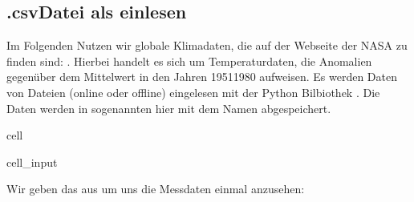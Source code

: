 \documentclass[letterpaper,10pt,english]{jupyterBook}
\begin{document}
\subsection{.csv\sphinxhyphen{}Datei als  einlesen}
\label{\detokenize{content/T_Plotten:csv-datei-als-dataframe-einlesen}}
\sphinxAtStartPar
Im Folgenden Nutzen wir globale Klimadaten, die auf der Webseite der NASA zu finden sind: . Hierbei handelt es sich um Temperaturdaten, die Anomalien gegenüber dem Mittelwert in den Jahren 1951\sphinxhyphen{}1980 aufweisen.
Es werden Daten von Dateien (online oder offline) eingelesen mit der Python Bilbiothek . Die Daten werden in sogenannten  hier mit dem Namen  abgespeichert.

\begin{sphinxuseclass}{cell}\begin{sphinxVerbatimInput}

\begin{sphinxuseclass}{cell_input}
\begin{sphinxVerbatim}[commandchars=\\\{\}]
  
      
\end{sphinxVerbatim}

\end{sphinxuseclass}\end{sphinxVerbatimInput}

\end{sphinxuseclass}
\sphinxAtStartPar
Wir geben das  aus um uns die Messdaten einmal anzusehen:
\end{document}
